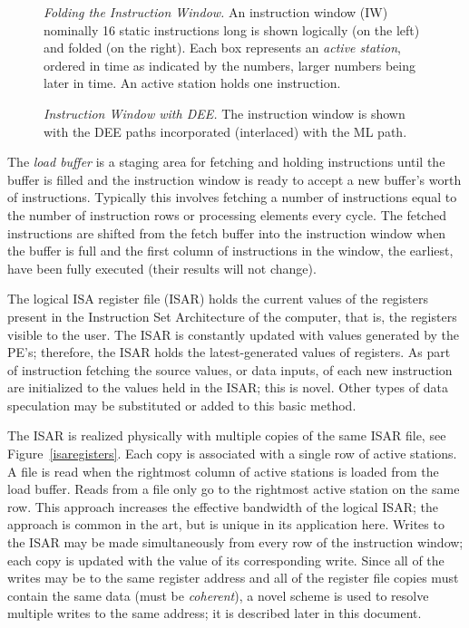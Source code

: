 \documentclass[10pt,dvips]{article}
\begin{document}
\begin{figure}
\centering
{}
\caption{{\em Folding the Instruction Window.} An instruction window (IW) nominally 16
static instructions long is shown logically (on the left) and folded (on the right).
Each box represents an {\it active station}, ordered in time as indicated by the numbers,
larger numbers being later in time. An active station holds one instruction.}
\label{foldediwindow}
\end{figure}

\begin{figure}
\centering
{}
\caption{{\em Instruction Window with DEE.} The instruction window is shown with
the DEE paths incorporated (interlaced) with the ML path.}
\label{deeiwindow}
\end{figure}


The {\it load
buffer} is a staging area for fetching and holding instructions until the buffer is
filled and the instruction window is ready to accept a new buffer's worth of
instructions. Typically this involves
fetching a number of instructions equal to the number of instruction rows or
processing elements every
cycle. The fetched instructions are shifted from the fetch buffer into the
instruction window when the buffer is full and the first column of instructions in the
window, the earliest, have been fully executed (their results will not change).

The logical
ISA register file (ISAR) holds the current values of the registers present in the
Instruction Set Architecture of the computer, that is, the registers visible to
the user. The ISAR is constantly updated with values generated by the PE's; therefore,
the ISAR holds the latest-generated values of registers.
As part of instruction fetching the source values, or data inputs,
of each new instruction are initialized to the values held in the ISAR; this is novel.
Other types
of data speculation may be substituted or added to this basic method.

The ISAR is realized physically with multiple copies of the same ISAR file, see
Figure~\ref{isaregisters}. Each copy is associated with a single row of active
stations. A file is read when the rightmost column of active stations is
loaded from the load buffer. Reads from a file only go to the rightmost active
station on the same row. This approach increases the effective bandwidth
of the logical ISAR; the approach is common in the art, but is unique in its
application here. Writes to the ISAR may be made simultaneously from every
row of the instruction window; each copy is updated with the value of its
corresponding
write. Since all of the writes may be to the same register address and all of the
register file copies must contain the same data (must be {\it coherent}), a
novel scheme is used to resolve multiple writes to the same address; it is
described later in this document.
\end{document}
